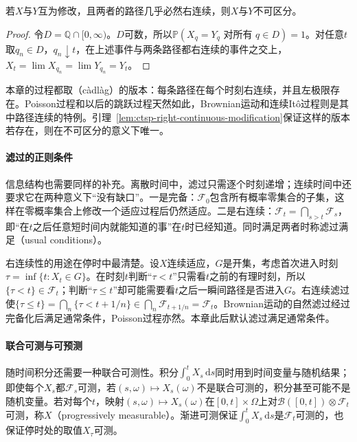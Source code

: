 \begin{lemma}[右连续修改不可区分]
  \label{lem:ctsp-right-continuous-modification}
  若$X$与$Y$互为修改，且两者的路径几乎必然右连续，则$X$与$Y$不可区分。
\end{lemma}

\begin{proof}
令$D=\mathbb Q\cap[0,\infty)$。$D$可数，所以$\mathbb P(X_q=Y_q\text{ 对所有 }q\in D)=1$。对任意$t$取$q_n\in D$，$q_n\downarrow t$，在上述事件与两条路径都右连续的事件之交上，$X_t=\lim X_{q_n}=\lim Y_{q_n}=Y_t$。
\end{proof}

本章的过程都取（càdlàg）的版本：每条路径在每个时刻右连续，并且左极限存在。Poisson过程和以后的跳跃过程天然如此，Brownian运动和连续Itô过程则是其中路径连续的特例。引理~\ref{lem:ctsp-right-continuous-modification}保证这样的版本若存在，则在不可区分的意义下唯一。

\paragraph{滤过的正则条件}
信息结构也需要同样的补充。离散时间中，滤过只需逐个时刻递增；连续时间中还要求它在两种意义下“没有缺口”。一是完备：$\mathcal F_0$包含所有概率零集合的子集，这样在零概率集合上修改一个适应过程后仍然适应。二是右连续：$\mathcal F_t=\bigcap_{s>t}\mathcal F_s$，即“在$t$之后任意短时间内就能知道的事”在$t$时已经知道。同时满足两者时称滤过满足（usual conditions）。

右连续性的用途在停时中最清楚。设$X$连续适应，$G$是开集，考虑首次进入时刻$\tau=\inf\{t:X_t\in G\}$。在时刻$t$判断“$\tau<t$”只需看$t$之前的有理时刻，所以$\{\tau<t\}\in\mathcal F_t$；判断“$\tau\leq t$”却可能需要看$t$之后一瞬间路径是否进入$G$。右连续滤过使$\{\tau\leq t\}=\bigcap_n\{\tau<t+1/n\}\in\bigcap_n\mathcal F_{t+1/n}=\mathcal F_t$。Brownian运动的自然滤过经过完备化后满足通常条件，Poisson过程亦然。本章此后默认滤过满足通常条件。

\paragraph{联合可测与可预测}
随时间积分还需要一种联合可测性。积分$\int_0^tX_s\,\mathrm ds$同时用到时间变量与随机结果；即使每个$X_s$都$\mathcal F_s$可测，若$(s,\omega)\mapsto X_s(\omega)$不是联合可测的，积分甚至可能不是随机变量。若对每个$t$，映射$(s,\omega)\mapsto X_s(\omega)$在$[0,t]\times\Omega$上对$\mathcal B([0,t])\otimes\mathcal F_t$可测，称$X$（progressively measurable）。渐进可测保证$\int_0^tX_s\,\mathrm ds$是$\mathcal F_t$可测的，也保证停时处的取值$X_\tau$可测。

